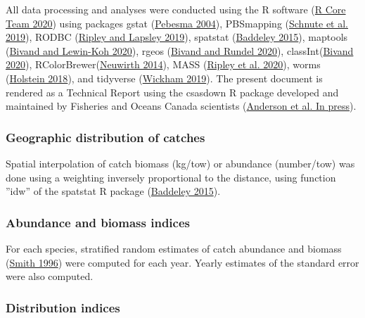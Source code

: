 \documentclass[12pt]{article}\usepackage[]{graphicx}\usepackage[]{color}
\begin{document}
All data processing and analyses were conducted using the R software (\protect\hyperlink{ref-R:2020}{R Core Team 2020}) using packages gstat (\protect\hyperlink{ref-R:package:gstat}{Pebesma 2004}), PBSmapping (\protect\hyperlink{ref-R:package:PBSmapping}{Schnute et al. 2019}), RODBC (\protect\hyperlink{ref-R:package:RODBC}{Ripley and Lapsley 2019}), spatstat (\protect\hyperlink{ref-R:package:spatstat}{Baddeley 2015}), maptools (\protect\hyperlink{ref-R:package:maptools}{Bivand and Lewin-Koh 2020}), rgeos (\protect\hyperlink{ref-R:package:rgeos}{Bivand and Rundel 2020}), classInt(\protect\hyperlink{ref-R:package:classInt}{Bivand 2020}), RColorBrewer(\protect\hyperlink{ref-R:package:RColorBrewer}{Neuwirth 2014}), MASS (\protect\hyperlink{ref-R:package:MASS}{Ripley et al. 2020}), worms (\protect\hyperlink{ref-R:package:worms}{Holstein 2018}), and tidyverse (\protect\hyperlink{ref-R:Tidyverse}{Wickham 2019}). The present document is rendered as a Technical Report using the csasdown R package developed and maintained by Fisheries and Oceans Canada scientists (\protect\hyperlink{ref-R:csasdown}{Anderson et al. In press}).

\hypertarget{geographic-distribution-of-catches}{%
\subsubsection{Geographic distribution of catches}\label{geographic-distribution-of-catches}}

Spatial interpolation of catch biomass (kg/tow) or abundance (number/tow) was done using a weighting inversely proportional to the distance, using function ''idw'' of the spatstat R package (\protect\hyperlink{ref-R:package:spatstat}{Baddeley 2015}).

\hypertarget{abundance-and-biomass-indices}{%
\subsubsection{Abundance and biomass indices}\label{abundance-and-biomass-indices}}

For each species, stratified random estimates of catch abundance and biomass (\protect\hyperlink{ref-Smith:1996}{Smith 1996}) were computed for each year. Yearly estimates of the standard error were also computed.

\hypertarget{distribution-indices}{%
\subsubsection{Distribution indices}\label{distribution-indices}}
\end{document}
